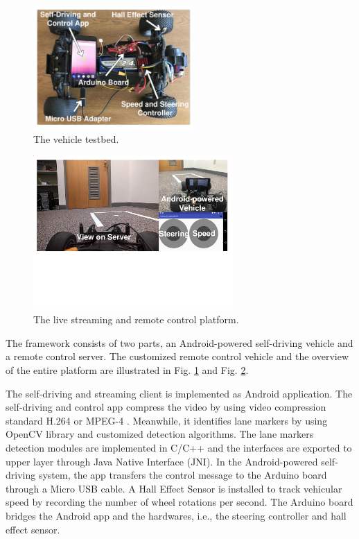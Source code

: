 

\begin{figure}[t]
\centering
  \includegraphics[width=2.4in,angle=0]{Figs/RTDrive/rc_car.pdf}
\vspace{-0.2cm}
\caption{The vehicle testbed.}
\vspace{-0.5cm}
\label{rc_vehicle}
\end{figure}

\begin{figure}[t]
\centering
  \includegraphics[width=3.0in,angle=0]{Figs/RTDrive/rc_car_cropped.pdf}
\vspace{-0.2cm}
\caption{The live streaming and remote control platform.}
\vspace{-0.2cm}
\label{platform}
\end{figure}


The framework consists of two parts, an Android-powered 
self-driving vehicle and a remote control server. 
The customized remote control vehicle
and the overview of the entire platform are illustrated in Fig. \ref{rc_vehicle} and Fig. \ref{platform}.


The self-driving and streaming client is implemented as
Android application. 
The self-driving and control app compress the video by using 
video compression standard H.264 or MPEG-4 \cite{marpe2006h}.  
Meanwhile, it identifies lane markers by using OpenCV
library and customized detection algorithms. 
The lane markers detection modules are implemented
in C/C++ and the interfaces are exported to upper 
layer through Java Native Interface (JNI).  
In the Android-powered self-driving system, 
the app transfers the control message to the
Arduino board through a Micro USB cable. 
A Hall Effect Sensor is installed to track vehicular speed
by recording the number of wheel rotations per second. 
The Arduino board bridges the Android app and the hardwares, 
i.e., the steering controller and hall effect sensor. 


